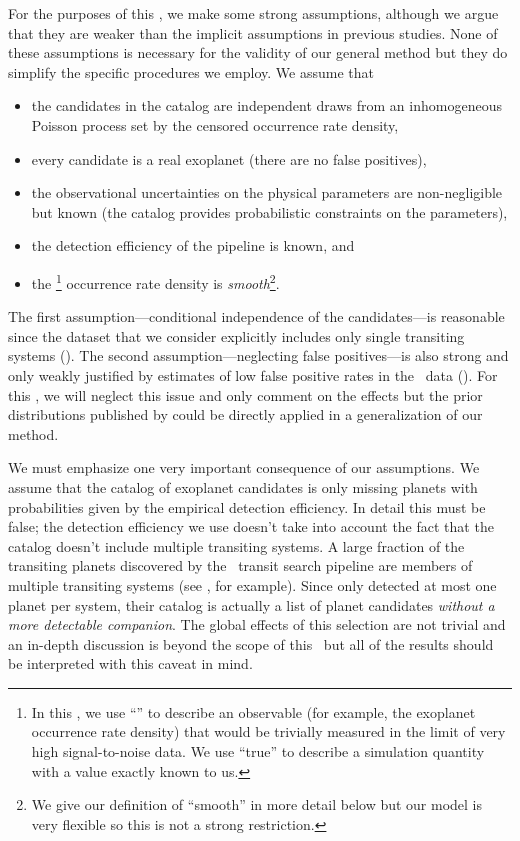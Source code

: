 For the purposes of this \paper, we make some strong assumptions, although we
argue that they are weaker than the implicit assumptions in previous
studies.
None of these assumptions is necessary for the validity of our general method
but they do simplify the specific procedures we employ.
We assume that
\begin{itemize}

\item the candidates in the catalog are independent draws from an
inhomogeneous Poisson process set by the censored occurrence rate density,

\item every candidate is a real exoplanet (there are no false positives),

\item the observational uncertainties on the physical parameters are
non-negligible but known (the catalog provides probabilistic constraints on
the parameters),

\item the detection efficiency of the pipeline is known, and

\item the \True\footnote{In this \paper, we use ``\True'' to describe an
observable (for example, the exoplanet occurrence rate density) that would be
trivially measured in the limit of very high signal-to-noise data.
We use ``true'' to describe a simulation quantity with a value exactly known
to us.} occurrence rate density is \emph{smooth}\footnote{We give our
definition of ``smooth'' in more detail below but our model is very flexible
so this is not a strong restriction.}.

\end{itemize}
The first assumption---conditional independence of the candidates---is
reasonable since the dataset that we consider explicitly includes only single
transiting systems (\citealt{Petigura:2013}).
The second assumption---neglecting false positives---is also strong and only
weakly justified by estimates of low false positive rates in the \kepler\ data
(\citealt{Fressin:2013, Morton:2012}).
For this \paper, we will neglect this issue and only comment on the effects
but the prior distributions published by \citet{Fressin:2013} could be directly
applied in a generalization of our method.

We must emphasize one very important consequence of our assumptions.
We assume that the catalog of exoplanet candidates is only missing planets
with probabilities given by the empirical detection efficiency.
In detail this must be false; the detection efficiency we use
doesn't take into account the fact that the catalog doesn't include multiple
transiting systems.
A large fraction of the transiting planets discovered by the \kepler\ transit
search pipeline are members of multiple transiting systems (see
\citealt{Lissauer:2011}, for example).
Since \citet{Petigura:2013} only detected at most one planet per system, their
catalog is actually a list of planet candidates \emph{without a more
detectable companion}.
The global effects of this selection are not trivial and an in-depth
discussion is beyond the scope of this \paper\ but all of the results should
be interpreted with this caveat in mind.

